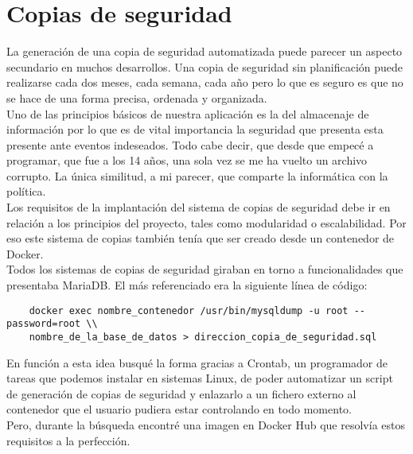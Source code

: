 \section{Copias de seguridad}
La generación de una copia de seguridad automatizada puede parecer un aspecto secundario en muchos desarrollos. Una copia de seguridad sin planificación puede realizarse cada dos meses, cada semana, cada año pero lo que es seguro es que no se hace de una forma precisa, ordenada y organizada.
\\Uno de las principios básicos de nuestra aplicación es la del almacenaje de información por lo que es de vital importancia la seguridad que presenta esta presente ante eventos indeseados. Todo cabe decir, que desde que empecé a programar, que fue a los 14 años, una sola vez se me ha vuelto un archivo corrupto. La única similitud, a mi parecer, que comparte la informática con la política.
\\Los requisitos de la implantación del sistema de copias de seguridad debe ir en relación a los principios del proyecto, tales como modularidad o escalabilidad. Por eso este sistema de copias también tenía que ser creado desde un contenedor de Docker.
\\Todos los sistemas de copias de seguridad giraban en torno a funcionalidades que presentaba MariaDB. El más referenciado era la siguiente línea de código:
\begin{verbatim}
    docker exec nombre_contenedor /usr/bin/mysqldump -u root --password=root \\
    nombre_de_la_base_de_datos > direccion_copia_de_seguridad.sql
\end{verbatim}
En función a esta idea busqué la forma gracias a Crontab, un programador de tareas que podemos instalar en sistemas Linux, de poder automatizar un script de generación de copias de seguridad y enlazarlo a un fichero externo al contenedor que el usuario pudiera estar controlando en todo momento.
\\Pero, durante la búsqueda encontré una imagen en Docker Hub que resolvía estos requisitos a la perfección.

